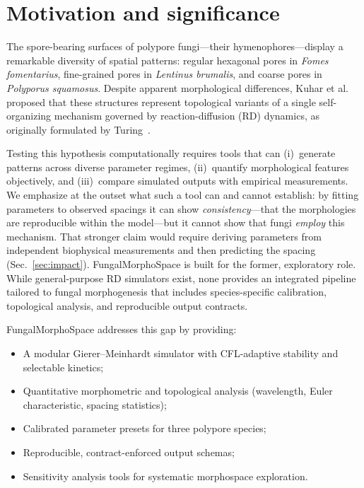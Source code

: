 \documentclass[review,3p]{elsarticle}
\begin{document}
\linenumbers

\section{Motivation and significance}
\label{sec:motivation}

The spore-bearing surfaces of polypore fungi---their
hymenophores---display a remarkable diversity of spatial patterns:
regular hexagonal pores in \textit{Fomes fomentarius}, fine-grained
pores in \textit{Lentinus brumalis}, and coarse pores in
\textit{Polyporus squamosus}. Despite apparent morphological
differences, Kuhar et al.~\cite{kuhar2022} proposed that these
structures represent topological variants of a single self-organizing
mechanism governed by reaction-diffusion (RD) dynamics, as originally
formulated by Turing~\cite{turing1952}.

Testing this hypothesis computationally requires tools that can
(i)~generate patterns across diverse parameter regimes, (ii)~quantify
morphological features objectively, and (iii)~compare simulated
outputs with empirical measurements. We emphasize at the outset what
such a tool can and cannot establish: by fitting parameters to observed
spacings it can show \emph{consistency}---that the morphologies are
reproducible within the model---but it cannot show that fungi
\emph{employ} this mechanism. That stronger claim would require deriving
parameters from independent biophysical measurements and then predicting
the spacing (Sec.~\ref{sec:impact}). FungalMorphoSpace is built for the
former, exploratory role. While general-purpose RD
simulators exist, none provides an integrated pipeline tailored to
fungal morphogenesis that includes species-specific calibration,
topological analysis, and reproducible output contracts.

FungalMorphoSpace addresses this gap by providing:
\begin{itemize}
  \item A modular Gierer--Meinhardt simulator with CFL-adaptive
        stability and selectable kinetics;
  \item Quantitative morphometric and topological analysis
        (wavelength, Euler characteristic, spacing statistics);
  \item Calibrated parameter presets for three polypore species;
  \item Reproducible, contract-enforced output schemas;
  \item Sensitivity analysis tools for systematic morphospace
        exploration.
\end{itemize}
\end{document}
